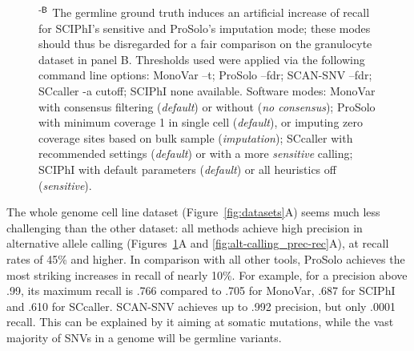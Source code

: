 \documentclass[authoryear,preprint,11pt]{scrartcl}
\begin{document}
\begin{figure}[!tpb]
{  $^\text{\sffamily-B}$ The germline ground truth induces an artificial increase of recall for SCIPhI's sensitive and ProSolo's imputation mode; these modes should thus be disregarded for a fair comparison on the granulocyte dataset in panel B.\newline \footnotesize
  Thresholds used were applied via the following command line options:
  MonoVar {\ttfamily --t};
  ProSolo {\ttfamily --fdr};
  SCAN-SNV {\ttfamily --fdr};
  SCcaller {\ttfamily -a cutoff};
  SCIPhI {\ttfamily none available}.
  Software modes:
  MonoVar with consensus filtering ({\itshape default}) or without ({\itshape no consensus});
  ProSolo with minimum coverage 1 in single cell ({\itshape default}), or imputing zero coverage sites based on bulk sample ({\itshape imputation});
  SCcaller with recommended settings ({\itshape default}) or with a more {\itshape sensitive} calling;
  SCIPhI with default parameters ({\itshape default}) or all heuristics off ({\itshape sensitive}).
  }
 \label{fig:alt-calling_prec-rec_global}
\end{figure}

The whole genome cell line dataset (Figure~\ref{fig:datasets}A) seems much less challenging than the other dataset: all methods achieve high precision in alternative allele calling (Figures~\ref{fig:alt-calling_prec-rec_global}A and \ref{fig:alt-calling_prec-rec}A), at recall rates of 45\% and higher. 
In comparison with all other tools, ProSolo achieves the most striking increases in recall of nearly 10\%.
For example, for a precision above .99, its maximum recall is .766 compared to .705 for MonoVar, .687 for SCIPhI and .610 for SCcaller.
SCAN-SNV achieves up to .992 precision, but only .0001 recall.
This can be explained by it aiming at somatic mutations, while the vast majority of SNVs in a genome will be germline variants.
\end{document}
